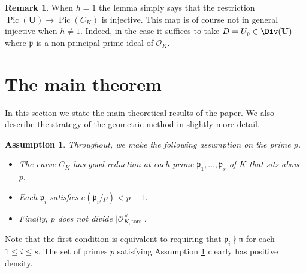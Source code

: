 \documentclass[11pt,oneside]{amsart}
\theoremstyle{plain}
\newtheorem{assumption}[theorem]{Assumption}
\theoremstyle{definition}
\newtheorem{remark}[theorem]{Remark}
\DeclareMathOperator{\tors}{tors}
\DeclareMathOperator{\Pic}{Pic}
\def\Q{\mathbb{Q}}
\def\U{\mathbf{U}}
\def\oh{\mathcal{O}}
\begin{document}
\begin{remark}
When $h = 1$ the lemma simply says that the restriction $\Pic (\U) \rightarrow \Pic (C_K) $ is injective. This map is of course not in general injective when $h\neq 1$.  Indeed, in the case it suffices to take $D=U_{\mathfrak{p}}\in \Div(\U)$ where $\mathfrak{p}$ is a non-principal prime ideal of $\oh_K$.  
\end{remark}





\section{The main theorem}\label{s:method}

In this section we state the main theoretical results of the paper. We  also describe the strategy of the geometric method in slightly more detail. 

\begin{assumption}\label{passumption} 
 Throughout, we make the following assumption on the prime $p$. 
\begin{itemize}
\item The curve $C_K$ has good reduction at each prime $\mathfrak{p}_1, \ldots, \mathfrak{p}_s$ of $K$ that sits above $p$. 
\item Each $\mathfrak{p}_i$ satisfies $e(\mathfrak{p}_i/p) < p-1$. 
\item Finally, $p$ does not divide $\vert \oh_{K, \mathrm{tors}}^\times \vert$.
\end{itemize}
\end{assumption}
\noindent Note that the first condition is equivalent to requiring that $\mathfrak{p}_i \nmid \mathfrak{n}$ for each $1\leq i\leq s$. %
The set of primes $p$ satisfying Assumption \ref{passumption} clearly has positive density. 

\end{document}
